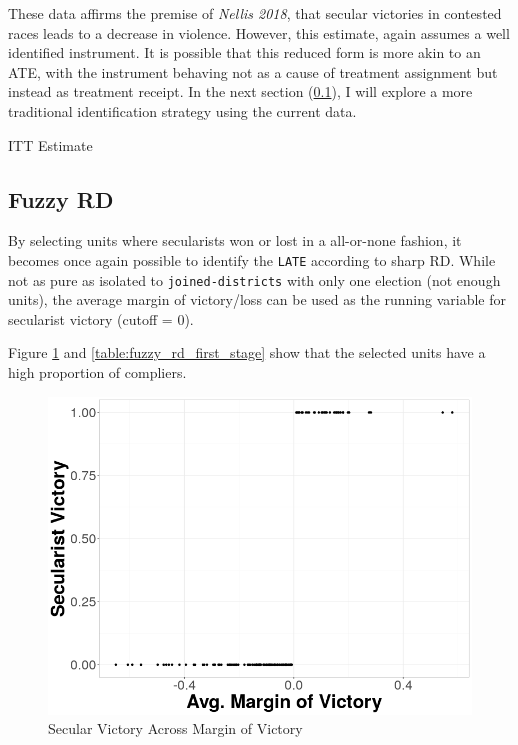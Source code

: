 \documentclass{scrartcl}
\begin{document}
These data affirms the premise of \textit{Nellis 2018}, that secular victories in contested races leads to a decrease in violence.
However, this estimate, again assumes a well identified instrument.
It is possible that this reduced form is more akin to an ATE, with the instrument behaving not as a cause of treatment assignment but instead as treatment receipt. 
In the next section (\ref{fuzzyrd}), I will explore a more traditional identification strategy using the current data.

\begin{table}[h!]
  \begin{center}
    \scalebox{0.65}{
      
    }
    \caption{ITT Estimate}
    \label{table:itt}
  \end{center}
\end{table}

\subsection{Fuzzy RD} \label{fuzzyrd}

By selecting units where secularists won or lost in a all-or-none fashion, it becomes once again possible to identify the \texttt{LATE} according to sharp RD.
While not as pure as isolated to \texttt{joined-districts} with only one election (not enough units), the average margin of victory/loss can be used as the running variable for secularist victory (cutoff = $0$). 

Figure \ref{fig:fuzzy_rd_treatment} and \ref{table:fuzzy_rd_first_stage} show that the selected units have a high proportion of compliers.


\begin{figure}[h!]
  \centering
  \includegraphics[width=0.6\linewidth]{replication/output/fuzzy_rd_treatment.png}
  \caption{Secular Victory Across Margin of Victory}
  \label{fig:fuzzy_rd_treatment}
\end{figure}
\end{document}

